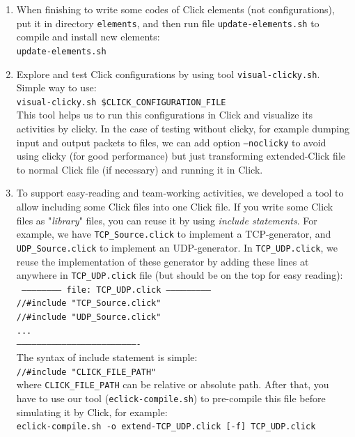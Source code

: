 \documentclass[a4paper]{article}
\begin{document}
\begin{enumerate}
        \item 
          When finishing to write some codes of Click elements (not configurations), put it in directory \texttt{elements}, and then run file \texttt{update-elements.sh} to compile and install new elements: \\
    \texttt{update-elements.sh}
        \item Explore and test Click configurations by using tool \texttt{visual-clicky.sh}. Simple way to use: \\    
    \texttt{visual-clicky.sh \$CLICK\_CONFIGURATION\_FILE} \\
    This tool helps us to run this configurations in Click and visualize its activities by clicky. In the case of testing without clicky, for example dumping input and output packets to files, we can add option \texttt{--noclicky} to avoid using clicky (for good performance) but just transforming extended-Click file to normal Click file (if necessary) and running it in Click.
        \item
        To support easy-reading and team-working activities, we developed a tool to allow including some Click files into one Click file. If you write some Click files as "\textit{library}" files, you can reuse it by using \textit{include statements}. For example, we have \texttt{TCP\_Source.click} to implement a TCP-generator, and \texttt{UDP\_Source.click} to implement an UDP-generator. In \texttt{TCP\_UDP.click}, we reuse the implementation of these generator by adding these lines at anywhere in \texttt{TCP\_UDP.click} file (but should be on the top for easy reading): \\
        \texttt{
  ------------------------ file: TCP\_UDP.click ---------------------------\\
  //#include "TCP\_Source.click"\\
  //#include "UDP\_Source.click"\\
  ...\\
  -------------------------------------------------------------------------}\\
  The syntax of include statement is simple:\\
          \texttt{//\#include "CLICK\_FILE\_PATH"}\\
  where \texttt{CLICK\_FILE\_PATH} can be relative or absolute path. After that, you have to use our tool (\texttt{eclick-compile.sh}) to pre-compile this file before simulating it by Click, for example:\\
    \texttt{eclick-compile.sh -o extend-TCP\_UDP.click [-f] TCP\_UDP.click}\\

\end{enumerate}
\end{document}
